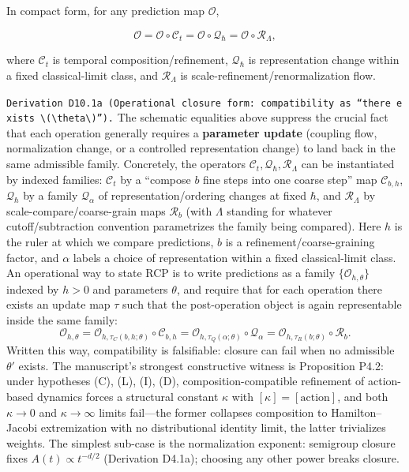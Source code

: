 \documentclass[
]{article}
\begin{document}
In compact form, for any prediction map \(\mathcal O\),

\[
\mathcal O
=
\mathcal O\circ\mathcal C_t
=
\mathcal O\circ\mathcal Q_\hbar
=
\mathcal O\circ\mathcal R_\Lambda,
\]

where \(\mathcal C_t\) is temporal composition/refinement,
\(\mathcal Q_\hbar\) is representation change within a fixed
classical-limit class, and \(\mathcal R_\Lambda\) is
scale-refinement/renormalization flow.

\texttt{Derivation\ D10.1a\ (Operational\ closure\ form:\ compatibility\ as\ “there\ exists\ \textbackslash{}(\textbackslash{}theta\textquotesingle{}\textbackslash{})”).}
The schematic equalities above suppress the crucial fact that each
operation generally requires a \textbf{parameter update} (coupling flow,
normalization change, or a controlled representation change) to land
back in the same admissible family. Concretely, the operators
\(\mathcal C_t,\mathcal Q_\hbar,\mathcal R_\Lambda\) can be instantiated
by indexed families: \(\mathcal C_t\) by a ``compose \(b\) fine steps
into one coarse step'' map \(\mathcal C_{b,h}\), \(\mathcal Q_\hbar\) by
a family \(\mathcal Q_\alpha\) of representation/ordering changes at
fixed \(\hbar\), and \(\mathcal R_\Lambda\) by
scale-compare/coarse-grain maps \(\mathcal R_b\) (with \(\Lambda\)
standing for whatever cutoff/subtraction convention parametrizes the
family being compared). Here \(h\) is the ruler at which we compare
predictions, \(b\) is a refinement/coarse-graining factor, and
\(\alpha\) labels a choice of representation within a fixed
classical-limit class. An operational way to state RCP is to write
predictions as a family \(\{\mathcal O_{h,\theta}\}\) indexed by \(h>0\)
and parameters \(\theta\), and require that for each operation there
exists an update map \(\tau\) such that the post-operation object is
again representable inside the same family: \[
\mathcal O_{h,\theta}
=
\mathcal O_{h,\tau_C(b,h;\theta)}\circ \mathcal C_{b,h}
=
\mathcal O_{h,\tau_Q(\alpha;\theta)}\circ \mathcal Q_\alpha
=
\mathcal O_{h,\tau_R(b;\theta)}\circ \mathcal R_b.
\] Written this way, compatibility is falsifiable: closure can fail when
no admissible \(\theta'\) exists. The manuscript's strongest
constructive witness is Proposition P4.2: under hypotheses (C), (L),
(I), (D), composition-compatible refinement of action-based dynamics
forces a structural constant \(\kappa\) with
\([\kappa]=[\mathrm{action}]\), and both \(\kappa\to0\) and
\(\kappa\to\infty\) limits fail---the former collapses composition to
Hamilton--Jacobi extremization with no distributional identity limit,
the latter trivializes weights. The simplest sub-case is the
normalization exponent: semigroup closure fixes \(A(t)\propto t^{-d/2}\)
(Derivation D4.1a); choosing any other power breaks closure.
\end{document}
